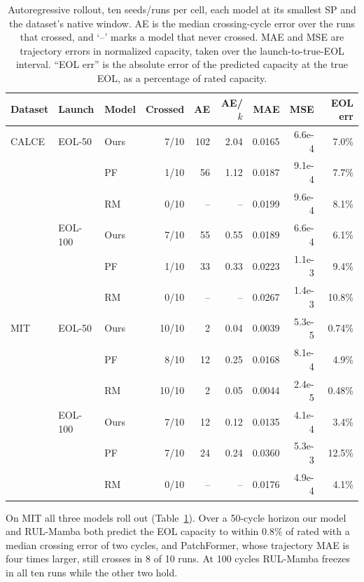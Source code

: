 \begin{table}[htbp]
\centering
\caption{Autoregressive rollout, ten seeds/runs per cell, each model at its
smallest SP and the dataset's native window. AE is the median crossing-cycle
error over the runs that crossed, and `--' marks a model that never crossed.
MAE and MSE are trajectory errors in normalized capacity, taken over the
launch-to-true-EOL interval. ``EOL err'' is the absolute error of the predicted
capacity at the true EOL, as a percentage of rated capacity.}
\label{tab:ar}
\scriptsize
\setlength{\tabcolsep}{2pt}
\begin{tabular}{lll r rr r r r}
\toprule
Dataset & Launch & Model & Crossed & AE & AE/$k$ & MAE & MSE & EOL err \\
\midrule
CALCE   & EOL-50  & Ours & 7/10 & 102 & 2.04 & 0.0165 & 6.6e-4 & 7.0\% \\
        &         & PF   & 1/10 &  56 & 1.12 & 0.0187 & 9.1e-4 & 7.7\% \\
        &         & RM   & 0/10 &  -- &   -- & 0.0199 & 9.6e-4 & 8.1\% \\
        & EOL-100 & Ours & 7/10 &  55 & 0.55 & 0.0189 & 6.6e-4 & 6.1\% \\
        &         & PF   & 1/10 &  33 & 0.33 & 0.0223 & 1.1e-3 & 9.4\% \\
        &         & RM   & 0/10 &  -- &   -- & 0.0267 & 1.4e-3 & 10.8\% \\
\midrule
MIT     & EOL-50  & Ours & 10/10 &  2 & 0.04 & 0.0039 & 5.3e-5 & 0.74\% \\
        &         & PF    &  8/10 & 12 & 0.25 & 0.0168 & 8.1e-4 & 4.9\% \\
        &         & RM    & 10/10 &  2 & 0.05 & 0.0044 & 2.4e-5 & 0.48\% \\
        & EOL-100 & Ours &  7/10 & 12 & 0.12 & 0.0135 & 4.1e-4 & 3.4\% \\
        &         & PF    &  7/10 & 24 & 0.24 & 0.0360 & 5.3e-3 & 12.5\% \\
        &         & RM    &  0/10 & -- &   -- & 0.0176 & 4.9e-4 & 4.1\% \\
\bottomrule
\end{tabular}
\end{table}

On MIT all three models roll out (Table~\ref{tab:ar}). Over a 50-cycle horizon
our model and RUL-Mamba both predict the EOL capacity to within 0.8\% of rated
with a median crossing error of two cycles, and PatchFormer, whose trajectory
MAE is four times larger, still crosses in 8 of 10 runs. At 100 cycles
RUL-Mamba freezes in all ten runs while the other two hold.

